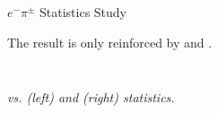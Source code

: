 \begin{frame}{$e^-\pi^\pm$ Statistics Study}
    \label{12.22::pi_statistics_study}

    The result is only reinforced by  and .

    \vspace{-12pt}

    \begin{columns}[onlytextwidth,T]

    \begin{column}{.49\linewidth}
        \begin{center}
            \begin{figure}[t]
            \end{figure}
        \end{center}
    \end{column}

    \begin{column}{.49\linewidth}
        \begin{center}
            \begin{figure}[t]
            \end{figure}
        \end{center}
    \end{column}

    \end{columns}

    \vspace{-18pt}

    \begin{center}
        \scriptsize{\textit{ vs. \ef{$\pi^-$} (left) and \ef{$\pi^+$} (right) statistics.}}
    \end{center}
\end{frame}
